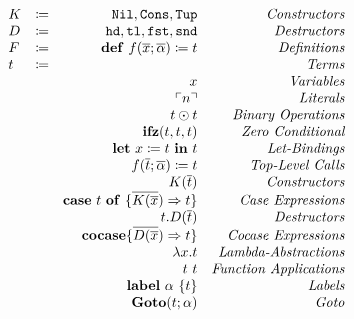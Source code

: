 \documentclass[nonacm]{acmart}
\newcommand{\lit}[1]{\ensuremath{\ulcorner #1\urcorner}}
\newcommand{\letin}[3]{\ensuremath{\mathbf{let}\ #1 \coloneq #2\ \mathbf{in}\ #3}}
\newcommand{\caseof}[2]{\ensuremath{\mathbf{case}\ #1\ \mathbf{of}\ \{ #2 \}}}
\begin{document}
\[ 
\begin{array}{l c r r} 
  K & \coloneqq & \mathtt{Nil}, \mathtt{Cons}, \mathtt{Tup} & \emph{Constructors}\\
  D & \coloneqq & \mathtt{hd}, \mathtt{tl}, \mathtt{fst}, \mathtt{snd} & \emph{Destructors}\\
  F & \coloneqq & \mathbf{def}\ f(\overline{x};\overline{\alpha}) \coloneq t & \emph{Definitions}\\
  t & \coloneqq & & \emph{Terms}\\
  && x & \emph{Variables}\\
  && \lit{n}  & \emph{Literals}\\
  && t \odot t & \emph{Binary Operations}\\
  && \mathbf{ifz}(t,t,t) & \emph{Zero Conditional}\\
  && \letin{x}{t}{t} & \emph{Let-Bindings}\\
  && f(\overline{t};\overline{\alpha}) \coloneq t & \emph{Top-Level Calls}\\
  && K(\overline{t}) & \emph{Constructors}\\
  && \caseof{t}{\overline{K(\overline{x}}) \Rightarrow t} & \emph{Case Expressions}\\
  && t.D(\overline{t}) & \emph{Destructors}\\
  && \mathbf{cocase} \{ \overline{ D(\overline{x}}) \Rightarrow t \} & \emph{Cocase Expressions}\\
  && \lambda x.t & \emph{Lambda-Abstractions}\\
  && t\ t & \emph{Function Applications}\\
  && \mathbf{label}\ \alpha\ \{t\} & \emph{Labels}\\
  && \mathbf{Goto}(t;\alpha) & \emph{Goto}
\end{array}
\]
\end{document}
